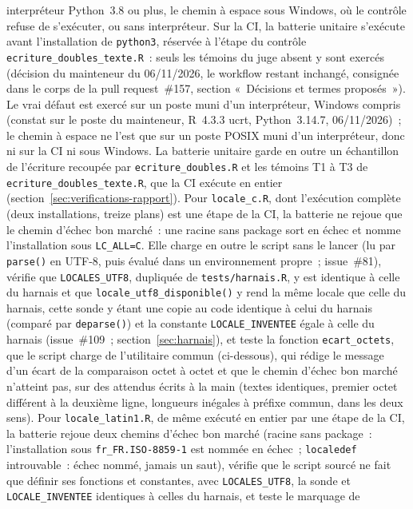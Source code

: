 \documentclass[a4paper,11pt]{article}
\newcommand{\code}[1]{\texttt{\small #1}}
\begin{document}
interpréteur Python~3.8 ou plus, le chemin à espace sous Windows, où le
contrôle refuse de s'exécuter, ou sans interpréteur. Sur la CI, la batterie
unitaire s'exécute avant l'installation de \code{python3}, réservée à
l'étape du contrôle \code{ecriture\_doubles\_texte.R}~: seuls les témoins
du juge absent y sont exercés (décision du mainteneur du 06/11/2026, le
workflow restant inchangé, consignée dans le corps de la pull
request~\#157, section «~Décisions et termes proposés~»). Le vrai défaut est exercé sur un poste muni
d'un interpréteur, Windows compris (constat sur le poste du mainteneur,
R~4.3.3 ucrt, Python~3.14.7, 06/11/2026)~; le chemin à espace ne l'est que
sur un poste POSIX muni d'un interpréteur, donc ni sur la CI ni sous
Windows. La batterie unitaire garde en outre un échantillon de l'écriture
recoupée par \code{ecriture\_doubles.R} et les témoins T1 à T3 de
\code{ecriture\_doubles\_texte.R}, que la CI exécute en entier
(section~\ref{sec:verifications-rapport}). Pour
\code{locale\_c.R}, dont l'exécution complète (deux installations, treize plans)
est une étape de la CI, la batterie ne rejoue que le chemin d'échec bon
marché~: une racine sans package sort en échec et nomme l'installation
sous \code{LC\_ALL=C}. Elle charge en outre le script sans le lancer
(lu par \code{parse()} en UTF-8, puis évalué dans un environnement
propre~; issue~\#81), vérifie que \code{LOCALES\_UTF8}, dupliquée de \code{tests/harnais.R}, y
est identique à celle du harnais et que \code{locale\_utf8\_disponible()}
y rend la même locale que celle du harnais, cette sonde y étant une copie
au code identique à celui du harnais (comparé par \code{deparse()}) et la
constante \code{LOCALE\_INVENTEE} égale à celle du harnais (issue~\#109~; section~\ref{sec:harnais}), et teste la fonction
\code{ecart\_octets}, que le script charge de l'utilitaire commun
(ci-dessous),
qui rédige le message d'un écart de la comparaison octet à octet et
que le chemin d'échec bon marché n'atteint pas, sur des attendus écrits à
la main (textes identiques, premier octet différent à la deuxième ligne,
longueurs inégales à préfixe commun, dans les deux sens). Pour
\code{locale\_latin1.R}, de même exécuté en entier par une étape de la CI,
la batterie rejoue deux chemins d'échec bon marché (racine sans package~:
l'installation sous \code{fr\_FR.ISO-8859-1} est nommée en échec~;
\code{localedef} introuvable~: échec nommé, jamais un saut), vérifie que
le script sourcé ne fait que définir ses fonctions et constantes, avec
\code{LOCALES\_UTF8}, la sonde et \code{LOCALE\_INVENTEE} identiques à
celles du harnais, et teste le marquage de
\end{document}
